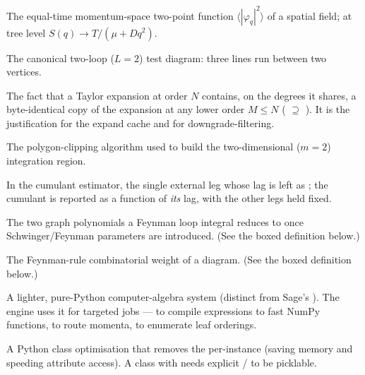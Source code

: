 \begin{description}[leftmargin=0pt,style=nextline]
  \item[Structure factor $S(q)$] The equal-time momentum-space two-point function
        $\langle|\varphi_q|^{2}\rangle$ of a spatial field; at tree level
        $S(q)\to T/(\mu+Dq^{2})$.

  \item[Sunset] The canonical two-loop ($L=2$) test diagram: three lines run between
        two vertices.

  \item[Superset theorem] The fact that a Taylor expansion at order $N$ contains, on
        the degrees it shares, a byte-identical copy of the expansion at any lower
        order $M\le N$ ( $\supseteq$ ). It is the
        justification for the expand cache and for downgrade-filtering.

  \item[Sutherland--Hodgman] The polygon-clipping algorithm used to build the
        two-dimensional ($m=2$) integration region.

  \item[Sweep axis] In the cumulant estimator, the single external leg whose lag is
        left as ; the cumulant is reported as a function of \emph{its} lag,
        with the other legs held fixed.

  \item[Symanzik polynomials ($\Usym$, $\Fsym$/$Q_{\mathrm{eff}}$)] The two graph
        polynomials a Feynman loop integral reduces to once Schwinger/Feynman
        parameters are introduced. (See the boxed definition below.)

  \item[Symmetry factor $\Sym(\Gamma)$] The Feynman-rule combinatorial weight of a
        diagram. (See the boxed definition below.)

  \item[\code{sympy}] A lighter, pure-Python computer-algebra system (distinct from
        Sage's ). The engine uses it for targeted jobs ---  to
        compile expressions to fast NumPy functions,  to route
        momenta,  to enumerate leaf orderings.

  \item[\code{\_\_slots\_\_}] A Python class optimisation that removes the per-instance
         (saving memory and speeding attribute access). A class with
         needs explicit
        / to be picklable.


\end{description}
